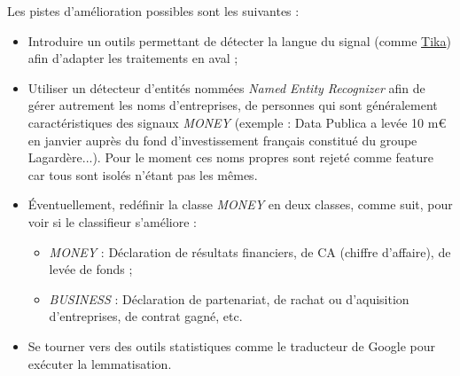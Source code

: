     Les pistes d'amélioration possibles sont les suivantes :
    \begin{itemize}
        \item Introduire un outils permettant de détecter la langue du signal (comme \href{https://tika.apache.org/}{Tika}) afin d'adapter les traitements en aval ;
        \item Utiliser un détecteur d'entités nommées \textit{Named Entity Recognizer} afin de gérer autrement les noms d'entreprises, de personnes qui sont généralement caractéristiques des signaux \textit{MONEY} (exemple : \og Data Publica a levée 10 m€ en janvier auprès du fond d'investissement français constitué du groupe Lagardère...\fg). Pour le moment ces noms propres sont rejeté comme feature car tous sont isolés n'étant pas les mêmes.
        \item Éventuellement, redéfinir la classe \textit{MONEY} en deux classes, comme suit, pour voir si le classifieur s'améliore :
        \begin{itemize}
            \item \textit{MONEY} : Déclaration de résultats financiers, de CA (chiffre d'affaire), de levée de fonds ;
            \item \textit{BUSINESS} : Déclaration de partenariat, de rachat ou d'aquisition d'entreprises, de \og contrat gagné\fg, etc.
        \end{itemize}
        \item Se tourner vers des outils statistiques comme le traducteur de Google pour exécuter la lemmatisation.\\
    \end{itemize}